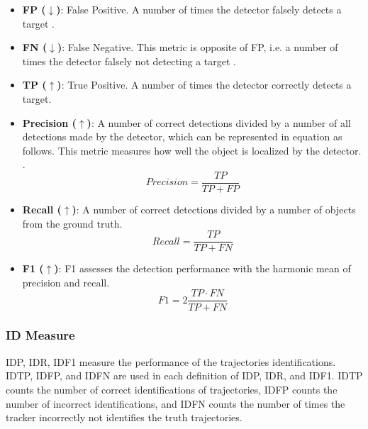 \begin{itemize}

\item \textbf{FP ($\downarrow$)}: False Positive. A number of times the detector falsely detects a target \cite{ristani_performance_2016}.

\item \textbf{FN ($\downarrow$)}: False Negative. This metric is opposite of FP, i.e. a number of times the detector falsely not detecting a target \cite{ristani_performance_2016}.

\item \textbf{TP ($\uparrow$)}: True Positive. A number of times the detector correctly detects a target. 

\item \textbf{Precision ($\uparrow$)}: A number of correct detections divided by a number of all detections made by the detector, which can be represented in equation as follows. This metric measures how well the object is localized by the detector. \cite{ristani_performance_2016} \cite{milan_mot16_2016}.
\begin{equation}
Precision = \frac{TP}{TP + FP}
\end{equation}

\item \textbf{Recall ($\uparrow$)}: A number of correct detections divided by a number of objects from the ground truth.
\begin{equation}
Recall = \frac{TP}{TP + FN}
\end{equation}

\item \textbf{F1 ($\uparrow$)}: F1 assesses the detection performance with the harmonic mean of precision and recall.
\begin{equation}
F1 = 2\frac{TP \cdot FN}{TP + FN}
\end{equation}
\end{itemize}




\subsubsection{ID Measure}
IDP, IDR, IDF1 measure the performance of the trajectories identifications. IDTP, IDFP, and IDFN are used in each definition of IDP, IDR, and IDF1. IDTP counts the number of correct identifications of trajectories, IDFP counts the number of incorrect identifications, and IDFN counts the number of times the tracker incorrectly not identifies the truth trajectories.

